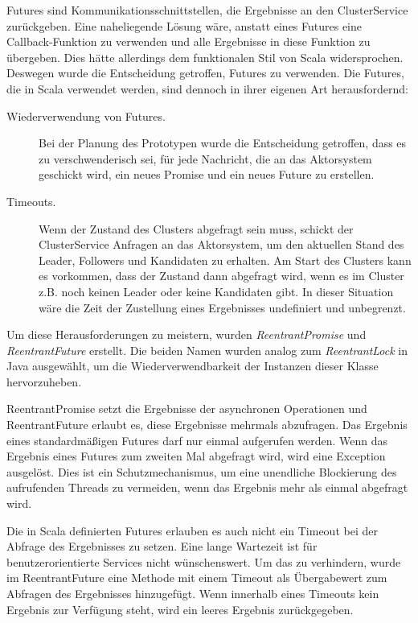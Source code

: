 Futures sind Kommunikationsschnittstellen, die Ergebnisse an den ClusterService zurückgeben. Eine naheliegende Lösung wäre, anstatt eines Futures eine Callback-Funktion zu verwenden und alle Ergebnisse in diese Funktion zu übergeben. Dies hätte allerdings dem funktionalen Stil von Scala widersprochen. Deswegen wurde die Entscheidung getroffen, Futures zu verwenden. Die Futures, die in Scala verwendet werden, sind dennoch in ihrer eigenen Art herausfordernd:

\begin{description} 
	\item[Wiederverwendung von Futures.] Bei der Planung des Prototypen wurde die Entscheidung getroffen, dass es zu verschwenderisch sei, für jede Nachricht, die an das Aktorsystem geschickt wird, ein neues Promise und ein neues Future zu erstellen.
	
	\item[Timeouts.] Wenn der Zustand des Clusters abgefragt sein muss, schickt der ClusterService Anfragen an das Aktorsystem, um den aktuellen Stand des Leader, Followers und Kandidaten zu erhalten. Am Start des Clusters kann es vorkommen, dass der Zustand dann abgefragt wird, wenn es im Cluster z.B. noch keinen Leader oder keine Kandidaten gibt. In dieser Situation wäre die Zeit der Zustellung eines Ergebnisses undefiniert und unbegrenzt.
\end{description}

Um diese Herausforderungen zu meistern, wurden \textit{ReentrantPromise} und \textit{ReentrantFuture} erstellt. Die beiden Namen wurden analog zum \textit{ReentrantLock} in Java ausgewählt, um die Wiederverwendbarkeit der Instanzen dieser Klasse hervorzuheben.

ReentrantPromise setzt die Ergebnisse der asynchronen Operationen und ReentrantFuture erlaubt es, diese Ergebnisse mehrmals abzufragen. Das Ergebnis eines standardmäßigen Futures darf nur einmal aufgerufen werden. Wenn das Ergebnis eines Futures zum zweiten Mal abgefragt wird, wird eine Exception ausgelöst. Dies ist ein Schutzmechanismus, um eine unendliche Blockierung des aufrufenden Threads zu vermeiden, wenn das Ergebnis mehr als einmal abgefragt wird.

Die in Scala definierten Futures erlauben es auch nicht ein Timeout bei der Abfrage des Ergebnisses zu setzen. Eine lange Wartezeit ist für benutzerorientierte Services nicht wünschenswert. Um das zu verhindern, wurde im ReentrantFuture eine Methode mit einem Timeout als Übergabewert zum Abfragen des Ergebnisses hinzugefügt. Wenn innerhalb eines Timeouts kein Ergebnis zur Verfügung steht, wird ein leeres Ergebnis zurückgegeben.

